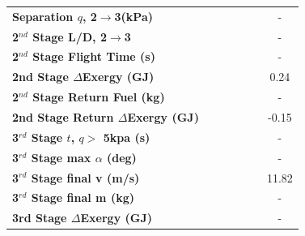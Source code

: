 \begin{table}[ht]
\begin{tabular}{l c c c c c c}
	\textbf{Separation $q$, 2$\rightarrow$3(kPa)}
	& \secondthirdSeparationqIspNinety
	& \secondthirdSeparationqIspNinetyFive
	& \secondthirdSeparationqIspStandard
	& \secondthirdSeparationqIspOneHundredFive
	& \secondthirdSeparationqIspOneHundredTen
	& -
	\\
	\textbf{2$^{nd}$ Stage L/D, 2$\rightarrow$3}
	& \secondthirdSeparationLDIspNinety
	& \secondthirdSeparationLDIspNinetyFive
	& \secondthirdSeparationLDIspStandard
	& \secondthirdSeparationLDIspOneHundredFive
	& \secondthirdSeparationLDIspOneHundredTen
	& -
	\\
	\textbf{2$^{nd}$ Stage Flight Time (s)}
	& \secondFlightTimeIspNinety
	& \secondFlightTimeIspNinetyFive
	& \secondFlightTimeIspStandard
	& \secondFlightTimeIspOneHundredFive
	& \secondFlightTimeIspOneHundredTen
	& -
	\\
	\textbf{2nd Stage $\Delta$Exergy (GJ)}
	& \seconddExergyIspNinety
	& \seconddExergyIspNinetyFive
	& \seconddExergyIspStandard
	& \seconddExergyIspOneHundredFive
	& \seconddExergyIspOneHundredTen
	&0.24
	\\
	\textbf{2$^{nd}$ Stage Return Fuel (kg)}
	& \returnFuelIspNinety
	& \returnFuelIspNinetyFive
	& \returnFuelIspStandard
	& \returnFuelIspOneHundredFive
	& \returnFuelIspOneHundredTen
	& -
	\\
	\textbf{2nd Stage Return $\Delta$Exergy (GJ)}
	& \returndExergyIspNinety
	& \returndExergyIspNinetyFive
	& \returndExergyIspStandard
	& \returndExergyIspOneHundredFive
	& \returndExergyIspOneHundredTen
	&-0.15
	\\
	\textbf{3$^{rd}$ Stage $t$, $q >$ 5kpa (s)}
	& \thirdqOverFiveIspNinety
	& \thirdqOverFiveIspNinetyFive
	& \thirdqOverFiveIspStandard
	& \thirdqOverFiveIspOneHundredFive
	& \thirdqOverFiveIspOneHundredTen
	& -
	\\
	\textbf{3$^{rd}$ Stage max $\alpha$ (deg)}
	& \thirdmaxAoAIspNinety
	& \thirdmaxAoAIspNinetyFive
	& \thirdmaxAoAIspStandard
	& \thirdmaxAoAIspOneHundredFive
	& \thirdmaxAoAIspOneHundredTen
	& -
	\\
	\textbf{3$^{rd}$ Stage final v (m/s)}
	& \thirdcircvIspNinety
	& \thirdcircvIspNinetyFive
	& \thirdcircvIspStandard
	& \thirdcircvIspOneHundredFive
	& \thirdcircvIspOneHundredTen
	&11.82
	\\
	\textbf{3$^{rd}$ Stage final m (kg)}
	& \thirdcircmIspNinety
	& \thirdcircmIspNinetyFive
	& \thirdcircmIspStandard
	& \thirdcircmIspOneHundredFive
	& \thirdcircmIspOneHundredTen
	& -
	\\
	\textbf{3rd Stage $\Delta$Exergy (GJ)}
	& \thirddExergyIspNinety
	& \thirddExergyIspNinetyFive
	& \thirddExergyIspStandard
	& \thirddExergyIspOneHundredFive
	& \thirddExergyIspOneHundredTen
	& -
	\\
	\hline 
\end{tabular} 

\end{table}

